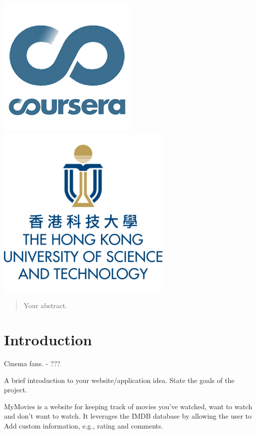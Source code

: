 \begin{titlepage}
\vfill
\includegraphics[width=.2\paperwidth]{coursera.png}
\hspace{2cm}
\includegraphics[width=.2\paperwidth]{hkust.png}

\end{titlepage}

\begin{abstract}
Your abstract.
\end{abstract}
\newpage

\section{Introduction}

Cinema fans. - ???

A brief introduction to your website/application idea. State the goals of the
project.

MyMovies is a website for keeping track of movies you've watched, want to
watch and don't want to watch. It leverages the IMDB database by allowing the
user to Add custom information, e.g., rating and comments.


